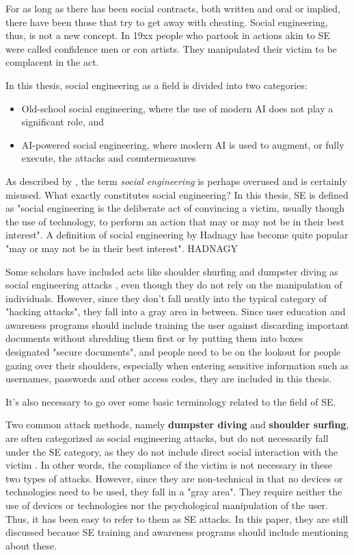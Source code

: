 For as long as there has been social contracts, both written and oral or implied, there have been those that try to get away with cheating. Social engineering, thus, is not a new concept. In 19xx people who partook in actions akin to SE were called confidence men or con artists. They manipulated their victim to be complacent in the act.

In this thesis, social engineering as a field is divided into two categories:

\begin{itemize}
    \item Old-school social engineering, where the use of modern AI does not play a significant role, and
    \item AI-powered social engineering, where modern AI is used to augment, or fully execute, the attacks and countermeasures
\end{itemize}

As described by \cite{abiteboul}, the term \textit{social engineering} is perhaps overused and is certainly misused. What exactly constitutes social engineering? In this thesis, SE is defined as "social engineering is the deliberate act of convincing a victim, usually though the use of technology, to perform an action that may or may not be in their best interest". A definition of social engineering by Hadnagy has become quite popular "may or may not be in their best interest". HADNAGY

Some scholars have included acts like shoulder shurfing and dumpster diving as social engineering attacks \citep{abiteboul}, even though they do not rely on the manipulation of individuals.  However, since they don't fall neatly into the typical category of "hacking attacks", they fall into a gray area in between. Since user education and awareness programs should include training the user against discarding important documents without shredding them first or by putting them into boxes designated "secure documents", and people need to be on the lookout for people gazing over their shoulders, especially when entering sensitive information such as usernames, passwords and other access codes, they are included in this thesis.

It's also necessary to go over some basic terminology related to the field of SE.

Two common attack methods, namely \textbf{dumpster diving} and \textbf{shoulder surfing}, are often categorized as social engineering attacks, but do not necessarily fall under the SE category, as they do not include direct social interaction with the victim \citep{wang_defining_2020}. In other words, the compliance of the victim is not necessary in these two types of attacks. However, since they are non-technical in that no devices or technologies need to be used, they fall in a "gray area". They require neither the use of devices or technologies nor the psychological manipulation of the user. Thus, it has been easy to refer to them as SE attacks. In this paper, they are still discussed because SE training and awareness programs should include mentioning about these.








